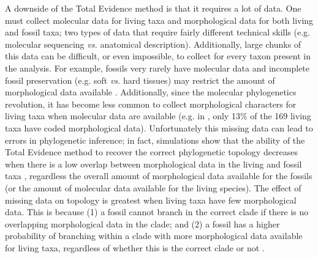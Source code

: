 A downside of the Total Evidence method is that it requires a lot of data.
One must collect molecular data for living taxa and morphological data for both living and fossil taxa; two types of data that require fairly different technical skills (e.g. molecular sequencing \textit{vs.} anatomical description).
Additionally, large chunks of this data can be difficult, or even impossible, to collect for every taxon present in the analysis.
For example, fossils very rarely have molecular data and incomplete fossil preservation (e.g. soft \textit{vs.} hard tissues) may restrict the amount of morphological data available \citep{sansomfossilization2013}.
Additionally, since the molecular phylogenetics revolution, it has become less common to collect morphological characters for living taxa when molecular data are available (e.g. in \citep{Slater2012MEE}, only 13\% of the 169 living taxa have coded morphological data).
Unfortunately this missing data can lead to errors in phylogenetic inference; in fact, simulations show that the ability of the Total Evidence method to recover the correct phylogenetic topology decreases when there is a low overlap between morphological data in the living and fossil taxa \citep{GuillermeCooper}, regardless the overall amount of morphological data available for the fossils (or the amount of molecular data available for the living species).
The effect of missing data on topology is greatest when living taxa have few morphological data.
This is because (1) a fossil cannot branch in the correct clade if there is no overlapping morphological data in the clade; and (2) a fossil has a higher probability of branching within a clade with more morphological data available for living taxa, regardless of whether this is the correct clade or not \citep{GuillermeCooper}. 

